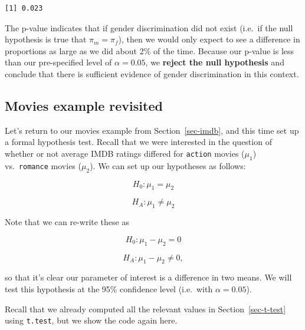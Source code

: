 \documentclass[
  letterpaper,
  DIV=11,
  numbers=noendperiod]{scrreprt}
\newenvironment{Shaded}{\begin{snugshade}}{\end{snugshade}}
\newcommand{\AttributeTok}[1]{\textcolor[rgb]{0.40,0.45,0.13}{#1}}
\newcommand{\FunctionTok}[1]{\textcolor[rgb]{0.28,0.35,0.67}{#1}}
\newcommand{\NormalTok}[1]{\textcolor[rgb]{0.00,0.23,0.31}{#1}}
\newcommand{\OtherTok}[1]{\textcolor[rgb]{0.00,0.23,0.31}{#1}}
\newcommand{\SpecialCharTok}[1]{\textcolor[rgb]{0.37,0.37,0.37}{#1}}
\newcommand{\StringTok}[1]{\textcolor[rgb]{0.13,0.47,0.30}{#1}}
\theoremstyle{definition}
\theoremstyle{remark}
\begin{document}
\begin{verbatim}
[1] 0.023
\end{verbatim}

The p-value indicates that if gender discrimination did not exist
(i.e.~if the null hypothesis is true that \(\pi_m = \pi_f\)), then we
would only expect to see a difference in proportions as large as we did
about 2\% of the time. Because our p-value is less than our
pre-specified level of \(\alpha = 0.05\), we \textbf{reject the null
hypothesis} and conclude that there is sufficient evidence of gender
discrimination in this context.

\hypertarget{movies-example-revisited}{%
\subsection{Movies example revisited}\label{movies-example-revisited}}

Let's return to our movies example from Section~\ref{sec-imdb}, and this
time set up a formal hypothesis test. Recall that we were interested in
the question of whether or not average IMDB ratings differed for
\texttt{action} movies (\(\mu_1\)) vs.~\texttt{romance} movies
(\(\mu_2\)). We can set up our hypotheses as follows:

\[H_0: \mu_1 = \mu_2\]

\[H_A: \mu_1 \neq \mu_2\]

Note that we can re-write these as

\[H_0: \mu_1 - \mu_2 = 0\]

\[H_A: \mu_1 - \mu_2 \neq 0,\]

so that it's clear our parameter of interest is a difference in two
means. We will test this hypothesis at the 95\% confidence level
(i.e.~with \(\alpha = 0.05\)).

Recall that we already computed all the relevant values in
Section~\ref{sec-t-test} using \texttt{t.test}, but we show the code
again here.

\begin{Shaded}
\end{Shaded}
\end{document}
